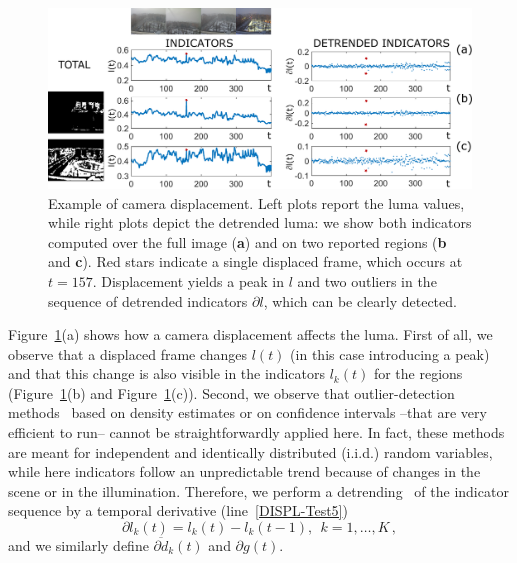 \documentclass{llncs}
\begin{document}
\begin{figure}[tb]
\centering
\includegraphics[width=1\linewidth]{Immagini/indicatori}
\caption{Example of camera displacement. Left plots report the luma values, while right plots depict the detrended luma: we show both indicators computed over the full image (\textbf{a}) and on two reported regions (\textbf{b} and \textbf{c}). Red stars indicate a single displaced frame, which occurs at $t =157$. Displacement yields a peak in $l$ and two outliers in the sequence of detrended indicators $\partial l$, which can be clearly detected. }
\label{fig:indicatori} 
\end{figure}
Figure~\ref{fig:indicatori}(a) shows how a camera displacement affects the luma. First of all, we observe that a displaced frame changes $l(t)$ (in this case introducing a peak) and that this change is also visible in the indicators $l_k(t)$ for the regions (Figure~\ref{fig:indicatori}(b) and Figure~\ref{fig:indicatori}(c)). Second, we observe that outlier-detection methods~\cite{Chandola2009} based on density estimates or on confidence intervals --that are very efficient to run-- cannot be straightforwardly applied here. In fact, these methods are meant for independent and identically distributed (i.i.d.) random variables, while here indicators follow an unpredictable trend because of changes in the scene or in the illumination. Therefore, we perform a detrending~\cite{Gustafsson2000} of the indicator sequence by a temporal derivative (line~\ref{DISPL-Test5})
\begin{equation}\label{eq:detrending}
 \partial l_k(t) = l_k(t)-l_k(t-1),  \ \ k = 1, \dots, K\,,
\end{equation}
and we similarly define $\overline{\partial d}_k(t)$ and $\partial g(t)$. 
\end{document}
